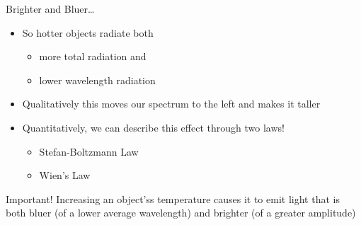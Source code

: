 \documentclass[pdf,xcolor={rgb},aspectratio=169]{beamer}
\begin{document}
\begin{frame}{Brighter and Bluer\ldots}
  \begin{itemize}
	\item So hotter objects radiate both
	  \begin{itemize}
		\item more total radiation and
		\item lower wavelength radiation
	  \end{itemize}
	\item Qualitatively this moves our spectrum to the left and makes it taller
	\item Quantitatively, we can describe this effect through two laws!
	  \begin{itemize}
		\item Stefan-Boltzmann Law
		\item Wien's Law
	  \end{itemize}
  \end{itemize}
  \begin{alertblock}{Important!}
	  Increasing an object'ss temperature causes it to emit light that is both bluer (of a lower average wavelength) and brighter (of a greater amplitude)
  \end{alertblock}
\end{frame}

\end{document}
